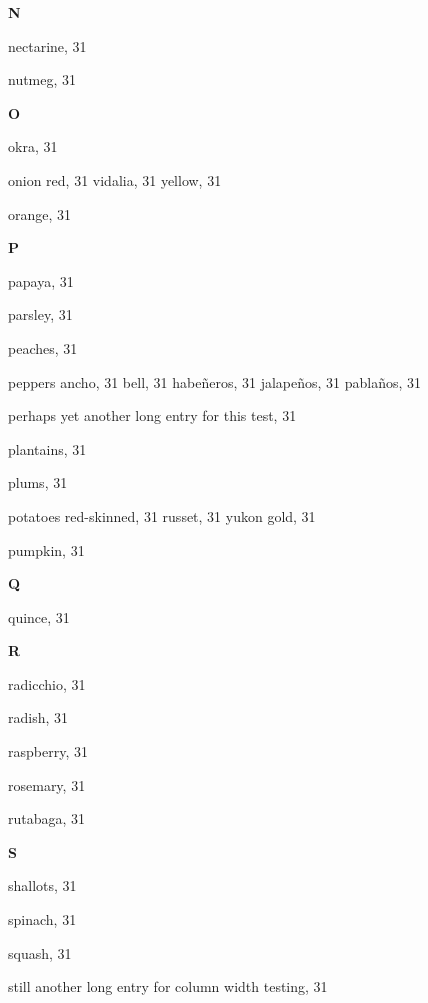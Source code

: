 \begin{theindex}
  \indexspace
{\sffamily\bfseries{N}}\nopagebreak

  \item nectarine, 31
  \item nutmeg, 31

  \indexspace
{\sffamily\bfseries{O}}\nopagebreak

  \item okra, 31\pagebreak %
  \item onion
    \subitem red, 31
    \subitem vidalia, 31
    \subitem yellow, 31
  \item orange, 31

  \indexspace
{\sffamily\bfseries{P}}\nopagebreak

  \item papaya, 31
  \item parsley, 31
  \item peaches, 31
  \item peppers
    \subitem ancho, 31
    \subitem bell, 31
    \subitem habe\~{n}eros, 31
    \subitem jalape\~{n}os, 31
    \subitem pabla\~{n}os, 31
  \item perhaps yet another long entry for this test, 31
  \item plantains, 31
  \item plums, 31
  \item potatoes
    \subitem red-skinned, 31
    \subitem russet, 31
    \subitem yukon gold, 31
  \item pumpkin, 31

  \indexspace
{\sffamily\bfseries{Q}}\nopagebreak

  \item quince, 31

  \indexspace
{\sffamily\bfseries{R}}\nopagebreak

  \item radicchio, 31
  \item radish, 31
  \item raspberry, 31
  \item rosemary, 31
  \item rutabaga, 31\newpage %

  \indexspace
{\sffamily\bfseries{S}}\nopagebreak

  \item shallots, 31
  \item spinach, 31
  \item squash, 31
  \item still another long entry for column width testing, 31


\end{theindex}
